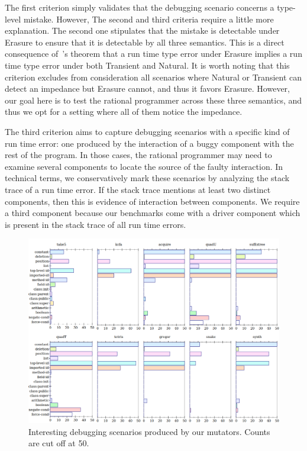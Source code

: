 The first criterion simply validates that the debugging scenario concerns
a type-level mistake. However, The second and third criteria require a
little more explanation.  The second one stipulates that the mistake is
detectable under Erasure to ensure that it is detectable by all three
semantics.  This is a direct consequence of~\citet{gfd-oopsla-2019}'s
theorem that a run time type error under Erasure implies a run time type
error under both Transient and Natural.  It is worth noting that this
criterion excludes from consideration all scenarios where Natural or
Transient can detect an impedance but Erasure cannot, and thus it favors
Erasure.  However, our goal here is to test the rational programmer across
these three semantics, and thus we opt for a setting where all of them
notice the impedance.


The third criterion aims to capture debugging scenarios with a specific
kind of run time error: one produced by the interaction of a buggy
component with the rest of the program.  In those cases, the rational programmer
may need to examine several components to locate the source of the faulty interaction.
In technical terms, we conservatively mark these scenarios by
analyzing the stack trace of a run time error.  If the stack trace mentions at
least two distinct components, then this is evidence of interaction between
components.  We require a third component because our benchmarks come
with a driver component which is present in the stack trace of all run
time errors.


\begin{figure}
  \centering
  \includegraphics[scale=0.35]{./plots/mutant-breakdown}
  \caption{Interesting debugging scenarios produced by our mutators. Counts are cut off at 50.}
  \label{fig:mutant-breakdown}
\end{figure}



